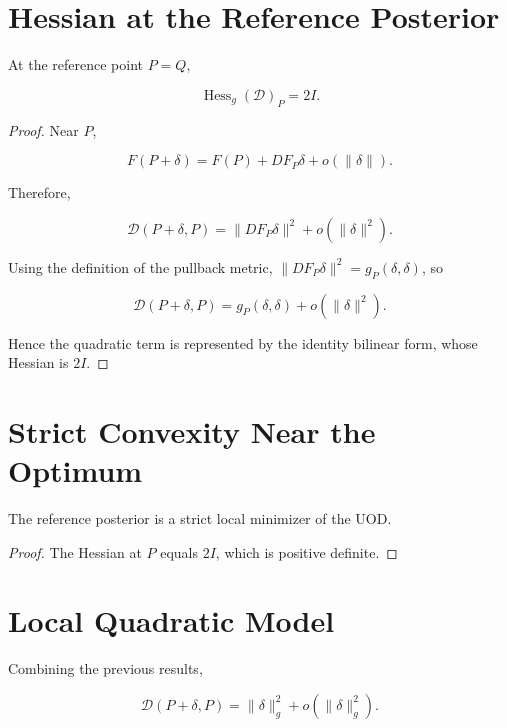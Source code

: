 \section{Hessian at the Reference Posterior}\label{ch:sec:hessian-at-the-reference-posterior}

\begin{theorem}
\label{ch:thm:22-4}
At the reference point \(P=Q\),

\[
\operatorname{Hess}_g(\mathcal D)_P = 2I.
\]
\end{theorem}

\begin{proof}
Near \(P\),

\[
F(P+\delta) = F(P)+DF_P\delta+o(\|\delta\|).
\]

Therefore,

\[
\mathcal D(P+\delta,P) = \|DF_P\delta\|^{2}+o(\|\delta\|^{2}).
\]

Using the definition of the pullback metric,
\(\|DF_P\delta\|^{2}=g_P(\delta,\delta)\), so

\[
\mathcal D(P+\delta,P) = g_P(\delta,\delta)+o(\|\delta\|^{2}).
\]

Hence the quadratic term is represented by the identity bilinear form,
whose Hessian is \(2I\). 
\end{proof}

\section{Strict Convexity Near the Optimum}\label{ch:sec:strict-convexity-near-the-optimum}

\begin{corollary}
\label{ch:cor:22-5}
The reference posterior is a strict local minimizer of the UOD.
\end{corollary}

\begin{proof}
The Hessian at \(P\) equals \(2I\), which is positive definite.
\end{proof}

\section{Local Quadratic Model}\label{ch:sec:local-quadratic-model}

Combining the previous results,

\[
\boxed{
\mathcal D(P+\delta,P)
=
\|\delta\|_g^2
+
o(\|\delta\|_g^2).
}
\]

